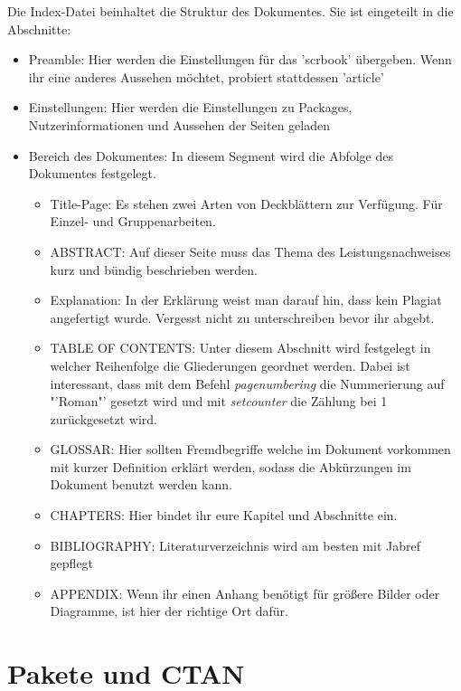 Die Index-Datei beinhaltet die Struktur des Dokumentes. Sie ist eingeteilt in die Abschnitte:
\begin{itemize}
	\item Preamble: Hier werden die Einstellungen für das 'scrbook' übergeben. Wenn ihr eine anderes Aussehen möchtet, probiert stattdessen 'article'
	\item Einstellungen: Hier werden die Einstellungen zu Packages, Nutzerinformationen und Aussehen der Seiten geladen
	\item Bereich des Dokumentes: In diesem Segment wird die Abfolge des Dokumentes festgelegt. 
	\begin{itemize}
		\item Title-Page: Es stehen zwei Arten von Deckblättern zur Verfügung. Für Einzel- und Gruppenarbeiten.
		\item ABSTRACT: Auf dieser Seite muss das Thema des Leistungsnachweises kurz und bündig beschrieben werden.
		\item Explanation: In der Erklärung weist man darauf hin, dass kein Plagiat angefertigt wurde. Vergesst nicht zu unterschreiben bevor ihr abgebt.
		\item TABLE OF CONTENTS: Unter diesem Abschnitt wird festgelegt in welcher Reihenfolge die Gliederungen geordnet werden. Dabei ist interessant, dass mit dem Befehl \emph{pagenumbering} die Nummerierung auf "'Roman"' gesetzt wird und mit \emph{setcounter} die Zählung bei 1 zurückgesetzt wird.
		\item GLOSSAR: Hier sollten Fremdbegriffe welche im Dokument vorkommen mit kurzer Definition erklärt werden, sodass die Abkürzungen im Dokument benutzt werden kann.
		\item CHAPTERS: Hier bindet ihr eure Kapitel und Abschnitte ein.
		\item BIBLIOGRAPHY: Literaturverzeichnis wird am besten mit Jabref gepflegt
		\item APPENDIX: Wenn ihr einen Anhang benötigt für größere Bilder oder Diagramme, ist hier der richtige Ort dafür.
	\end{itemize}
\end{itemize}


\section{Pakete und CTAN}

